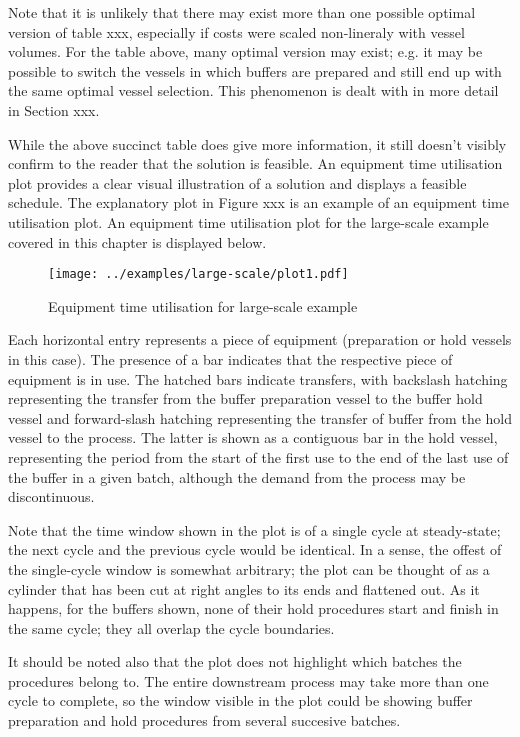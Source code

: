 Note that it is unlikely that there may exist more than one possible optimal
version of table xxx, especially if costs were scaled non-lineraly with vessel
volumes.
For the table above, many optimal version may exist; e.g. it may be possible to
switch the vessels in which buffers are prepared and still end up with the same
optimal vessel selection.
This phenomenon is dealt with in more detail in Section xxx.

While the above succinct table does give more information, it still doesn't
visibly confirm to the reader that the solution is feasible.
An equipment time utilisation plot provides a clear visual illustration of a
solution and displays a feasible schedule.
The explanatory plot in Figure xxx is an example of an equipment time
utilisation plot.  
An equipment time utilisation plot for the large-scale example covered in this
chapter is displayed below.
\begin{figure}
    \centering
    \texttt{[image: ../examples/large-scale/plot1.pdf]}
    \caption{Equipment time utilisation for large-scale example}
    \label{fig.etu1}
\end{figure}
Each horizontal entry represents a piece of equipment (preparation or hold
vessels in this case).
The presence of a bar indicates that the respective piece of equipment is in
use.  
The hatched bars indicate transfers, with backslash hatching representing the
transfer from the buffer preparation vessel to the buffer hold vessel and
forward-slash hatching representing the transfer of buffer from the hold vessel
to the process.
The latter is shown as a contiguous bar in the hold vessel, representing the
period from the start of the first use to the end of the last use of the buffer
in a given batch, although the demand from the process may be discontinuous.

Note that the time window shown in the plot is of a single cycle at
steady-state; the next cycle and the previous cycle would be identical.
In a sense, the offest of the single-cycle window is somewhat arbitrary; the
plot can be thought of as a cylinder that has been cut at right angles to its
ends and flattened out.
As it happens, for the buffers shown, none of their hold procedures start and
finish in the same cycle; they all overlap the cycle boundaries.

It should be noted also that the plot does not highlight which batches the
procedures belong to.
The entire downstream process may take more than one cycle to complete, so the
window visible in the plot could be showing buffer preparation and hold
procedures from several succesive batches.
